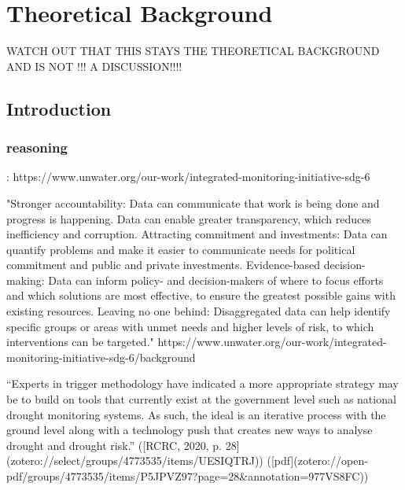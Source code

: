 
\chapter{Theoretical Background} %

\label{Chapter2} %
WATCH  OUT THAT THIS STAYS THE THEORETICAL BACKGROUND AND IS NOT !!! A DISCUSSION!!!!

\section{Introduction}


\subsection{reasoning}:
https://www.unwater.org/our-work/integrated-monitoring-initiative-sdg-6

"Stronger accountability: Data can communicate that work is being done and progress is happening. Data can enable greater transparency, which reduces inefficiency and corruption.
Attracting commitment and investments: Data can quantify problems and make it easier to communicate needs for political commitment and public and private investments.
Evidence-based decision-making: Data can inform policy- and decision-makers of where to focus efforts and which solutions are most effective, to ensure the greatest possible gains with existing resources.
Leaving no one behind: Disaggregated data can help identify specific groups or areas with unmet needs and higher levels of risk, to which interventions can be targeted."
https://www.unwater.org/our-work/integrated-monitoring-initiative-sdg-6/background

“Experts in trigger methodology have indicated a more appropriate strategy may be to build on tools that currently exist at the government level such as national drought monitoring systems. As such, the ideal is an iterative process with the ground level along with a technology push that creates new ways to analyse drought and drought risk.” ([RCRC, 2020, p. 28](zotero://select/groups/4773535/items/UESIQTRJ)) ([pdf](zotero://open-pdf/groups/4773535/items/P5JPVZ97?page=28&annotation=977VS8FC))

